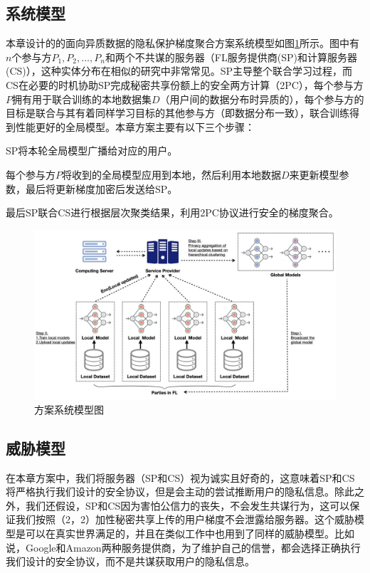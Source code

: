 \subsection{系统模型}
本章设计的的面向异质数据的隐私保护梯度聚合方案系统模型如图\ref{sysjpg}所示。图中有$n$个参与方$P_1,P_2,...,P_n$和两个不共谋的服务器（FL服务提供商(SP)和计算服务器(CS)），这种实体分布在相似的研究\cite{liu2021privacy, dong2021flod, hao2021efficient}中非常常见。SP主导整个联合学习过程，而CS在必要的时机协助SP完成秘密共享份额上的安全两方计算（2PC），每个参与方$P$拥有用于联合训练的本地数据集$D$（用户间的数据分布时异质的），每个参与方的目标是联合与其有着同样学习目标的其他参与方（即数据分布一致），联合训练得到性能更好的全局模型。本章方案主要有以下三个步骤：
\begin{compactenum}
    \item SP将本轮全局模型广播给对应的用户。
    \item 每个参与方$P$将收到的全局模型应用到本地，然后利用本地数据$D$来更新模型参数，最后将更新梯度加密后发送给SP。
    \item 最后SP联合CS进行根据层次聚类结果，利用2PC协议进行安全的梯度聚合。
\end{compactenum}


\begin{figure}[htbp]
    \begin{center}
        \includegraphics[scale=0.13]{figures/work2figs/system-model.jpg}
        \caption{方案系统模型图}
        \label{sysjpg}
    \end{center}
\end{figure}

\subsection{威胁模型}
在本章方案中，我们将服务器（SP和CS）视为诚实且好奇的，这意味着SP和CS将严格执行我们设计的安全协议，但是会主动的尝试推断用户的隐私信息。除此之外，我们还假设，SP和CS因为害怕公信力的丧失，不会发生共谋行为，这可以保证我们按照（2，2）加性秘密共享上传的用户梯度不会泄露给服务器。这个威胁模型是可以在真实世界满足的，并且在类似工作\cite{nguyen2022flame}中也用到了同样的威胁模型。比如说，Google和Amazon两种服务提供商，为了维护自己的信誉，都会选择正确执行我们设计的安全协议，而不是共谋获取用户的隐私信息。

